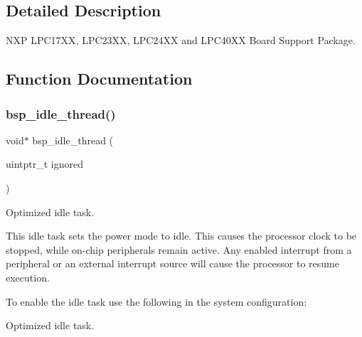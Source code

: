 \subsection{Detailed Description}
N\+XP L\+P\+C17\+XX, L\+P\+C23\+XX, L\+P\+C24\+XX and L\+P\+C40\+XX Board Support Package. 



\subsection{Function Documentation}
\mbox{\label{group__RTEMSBSPsARMLPC24XX_ga301be7085b80c41a9c5887247003c662}} 
\subsubsection{\texorpdfstring{bsp\_idle\_thread()}{bsp\_idle\_thread()}}
{\footnotesize\ttfamily void$\ast$ bsp\+\_\+idle\+\_\+thread (\begin{DoxyParamCaption}\item[{uintptr\+\_\+t}]{ignored }\end{DoxyParamCaption})}



Optimized idle task. 

This idle task sets the power mode to idle. This causes the processor clock to be stopped, while on-\/chip peripherals remain active. Any enabled interrupt from a peripheral or an external interrupt source will cause the processor to resume execution.

To enable the idle task use the following in the system configuration\+:


\begin{DoxyCode}{0}
\DoxyCodeLine{\textcolor{preprocessor}{\#include <bsp.h>}}
\DoxyCodeLine{}
\DoxyCodeLine{\textcolor{preprocessor}{\#define CONFIGURE\_INIT}}
\DoxyCodeLine{}
\DoxyCodeLine{\textcolor{preprocessor}{\#define CONFIGURE\_IDLE\_TASK\_BODY bsp\_idle\_thread}}
\DoxyCodeLine{}
\end{DoxyCode}


Optimized idle task.

